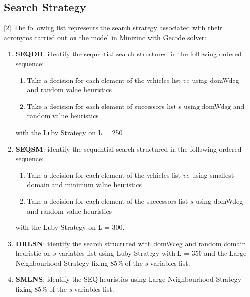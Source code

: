 \subsection{Search Strategy}
[2] The following list represents the search strategy associated with their acronyms carried out on the model in Minizinc with Gecode solver:
\begin{enumerate}
    \item \textbf{SEQDR}: identify the sequential search structured in the following ordered sequence:
    \begin{enumerate}
        \item Take a decision for each element of the vehicles list \begin{math} ve \end{math} using domWdeg and random value heuristics
        \item Take a decision for each element of successors list \begin{math} s \end{math} using domWdeg and random value heuristics
    \end{enumerate} with the Luby Strategy on L = 250
    \item \textbf{SEQSM}: identify the sequential search structured in the following ordered sequence:
    \begin{enumerate}
        \item Take a decision for each element of the vehicles list \begin{math} ve \end{math} using smallest domain and minimum value heuristics
        \item Take a decision for each element of the successors list \begin{math} s \end{math} using domWdeg and random value heuristics
        \end{enumerate} with the Luby Strategy on L = 300.
    \item \textbf{DRLSN}: identify the search structured with domWdeg and random domain heuristic on \begin{math} s \end{math} variables list using Luby Strategy with L = 350 and the Large Neighbourhood Strategy fixing 85\% of the \begin{math}s\end{math} variables list.
    \item \textbf{SMLNS}: identify the SEQ heuristics using Large Neighbourhood Strategy fixing 85\% of the \begin{math} s \end{math} variables list.
    
    
\end{enumerate}
\newpage
